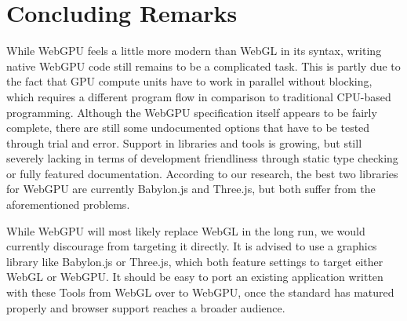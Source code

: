 %
%
% 
% 

\chapter{Concluding Remarks}


While WebGPU feels a little more modern than WebGL in its syntax,
writing native WebGPU code still remains to be a complicated task. This
is partly due to the fact that GPU compute units have to work in
parallel without blocking, which requires a different program flow in
comparison to traditional CPU-based programming.
%
Although the WebGPU specification itself appears to be fairly complete,
there are still some undocumented options that have to be tested through
trial and error. Support in libraries and tools is growing, but still
severely lacking in terms of development friendliness through static
type checking or fully featured documentation.
%
According to our research, the best two libraries for WebGPU are
currently Babylon.js and Three.js, but both suffer from the
aforementioned problems.

While WebGPU will most likely replace WebGL in the long run, we would
currently discourage from targeting it directly. It is advised to use a
graphics library like Babylon.js or Three.js, which both feature
settings to target either WebGL or WebGPU. It should be easy to port an
existing application written with these Tools from WebGL over to WebGPU,
once the standard has matured properly and browser support reaches a
broader audience.
